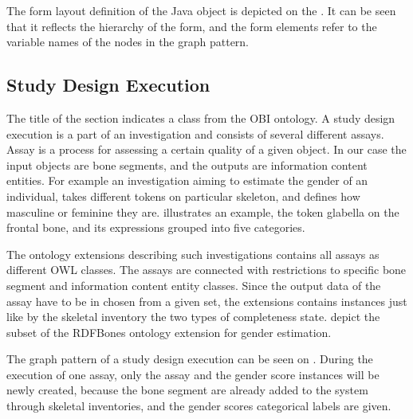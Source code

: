 
The form layout definition of the Java object is depicted on the . It can be seen that it reflects the hierarchy of the form, and the form elements refer to the variable names of the nodes in the graph pattern.


\subsection{Study Design Execution} \label{43}

The title of the section indicates a class from the OBI ontology. A study design execution is a part of an investigation and consists of several different assays. Assay is a process for assessing a certain quality of a given object. In our case the input objects are bone segments, and the outputs are information content entities. For example an investigation aiming to estimate the gender of an individual, takes different tokens on particular skeleton, and defines how masculine or feminine they are.  illustrates an example, the token glabella on the frontal bone, and its expressions grouped into five categories.


The ontology extensions describing such investigations contains all assays as different OWL classes. The assays are connected with restrictions to specific bone segment and information content entity classes. Since the output data of the assay have to be in chosen from a given set, the extensions contains instances just like by the skeletal inventory the two types of completeness state.  depict the subset of the RDFBones ontology extension for gender estimation.


The graph pattern of a study design execution can be seen on . During the execution of one assay, only the assay and the gender score instances will be newly created, because the bone segment are already added to the system through skeletal inventories, and the gender scores categorical labels are given.


